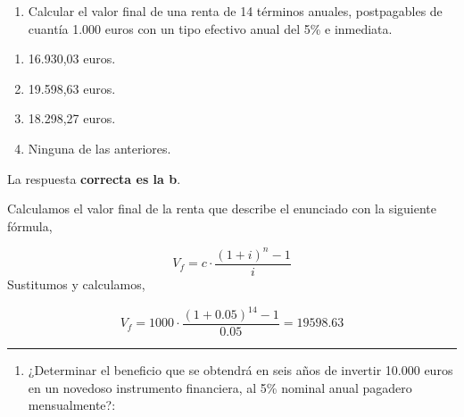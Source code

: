 \documentclass[
  letterpaper,
  DIV=11,
  numbers=noendperiod]{scrreprt}
\providecommand{\tightlist}{%
  \setlength{\itemsep}{0pt}\setlength{\parskip}{0pt}}\usepackage{longtable,booktabs,array}
\begin{document}
\begin{enumerate}
\def\labelenumi{\arabic{enumi}.}
\setcounter{enumi}{80}
\tightlist
\item
  Calcular el valor final de una renta de 14 términos anuales,
  postpagables de cuantía 1.000 euros con un tipo efectivo anual del 5\%
  e inmediata.
\end{enumerate}

\begin{enumerate}
\def\labelenumi{\alph{enumi})}
\item
  16.930,03 euros.
\item
  19.598,63 euros.
\item
  18.298,27 euros.
\item
  Ninguna de las anteriores.
\end{enumerate}

\begin{tcolorbox}[enhanced jigsaw, left=2mm, opacityback=0, colback=white, breakable, arc=.35mm, bottomrule=.15mm, rightrule=.15mm, toprule=.15mm, leftrule=.75mm, colframe=quarto-callout-tip-color-frame]
\begin{minipage}[t]{5.5mm}
\textcolor{quarto-callout-tip-color}{\faLightbulb}
\end{minipage}%
\begin{minipage}[t]{\textwidth - 5.5mm}

La respuesta \textbf{correcta es la b}.

Calculamos el valor final de la renta que describe el enunciado con la
siguiente fórmula,

\[V_f=c\cdot\frac{\left(1+i\right)^n-1}{i}\] Sustitumos y calculamos,

\[V_f=1000\cdot\frac{\left(1+0.05\right)^{14}-1}{0.05}=19598.63\]

\end{minipage}%
\end{tcolorbox}

\begin{center}\rule{0.5\linewidth}{0.5pt}\end{center}

\begin{enumerate}
\def\labelenumi{\arabic{enumi}.}
\setcounter{enumi}{81}
\tightlist
\item
  ¿Determinar el beneficio que se obtendrá en seis años de invertir
  10.000 euros en un novedoso instrumento financiera, al 5\% nominal
  anual pagadero mensualmente?:
\end{enumerate}
\end{document}
